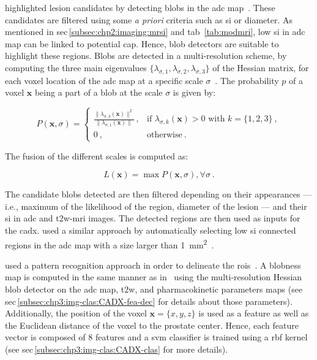 \citeauthor{Vos2012} highlighted lesion candidates by detecting blobs in the \ac{adc} map~\cite{Vos2012}.
These candidates are filtered using some \textit{a priori} criteria such as \ac{si} or diameter.
As mentioned in \acs{sec}\,\ref{subsec:chp2:imaging:mrsi} and \acs{tab}~\ref{tab:modmri}, low \ac{si} in \ac{adc} map can be linked to potential \ac{cap}.
Hence, blob detectors are suitable to highlight these regions. 
Blobs are detected in a multi-resolution scheme, by computing the three main eigenvalues $\{ \lambda_{\sigma,1},\lambda_{\sigma,2},\lambda_{\sigma,3} \}$ of the Hessian matrix, for each voxel location of the \ac{adc} map at a specific scale $\sigma$~\cite{Li2003}.
The probability $p$ of a voxel $\mathbf{x}$ being a part of a blob at the scale $\sigma$ is given by:

\begin{equation}
P(\mathbf{x},\sigma) = \begin{cases}
	\frac{\| \lambda_{\sigma,3}(\mathbf{x}) \|^{2}}{\| \lambda_{\sigma,1} (\mathbf{x}) \|} \ , & \text{if } \lambda_{\sigma,k}(\mathbf{x}) > 0 \text{ with } k = \{1,2,3\} \  , \\
	0 \ , & \text{otherwise} \ .
\end{cases}
\label{eq:blobdet}
\end{equation}

\noindent The fusion of the different scales is computed as:

\begin{equation}
	L(\mathbf{x}) = \max P(\mathbf{x},\sigma) , \forall \sigma \ .
	\label{eq:fusionBlob}
\end{equation}

The candidate blobs detected are then filtered depending on their appearances --- i.e., maximum of the likelihood of the region, diameter of the lesion --- and their \ac{si} in \ac{adc} and \ac{t2w}-\ac{mri} images.
The detected regions are then used as inputs for the \ac{cadx}.
\citeauthor{cameron2016maps} used a similar approach by automatically selecting low \ac{si} connected regions in the \ac{adc} map with a size larger than \SI{1}{\milli\metre\squared}~\cite{cameron2014multiparametric,cameron2016maps}.

\citeauthor{Litjens2011} used a pattern recognition approach in order to delineate the \acp{roi}~\cite{Litjens2011}.
A blobness map is computed in the same manner as in~\cite{Vos2010} using the multi-resolution Hessian blob detector on the \ac{adc} map, \ac{t2w}, and pharmacokinetic parameters maps (see \acs{sec}\,\ref{subsec:chp3:img-clas:CADX-fea-dec} for details about those parameters).
Additionally, the position of the voxel $\mathbf{x}=\{x,y,z\}$ is used as a feature as well as the Euclidean distance of the voxel to the prostate center.
Hence, each feature vector is composed of 8 features and a \ac{svm} classifier is trained using a \ac{rbf} kernel (see \acs{sec}\,\ref{subsec:chp3:img-clas:CADX-clas} for more details).

